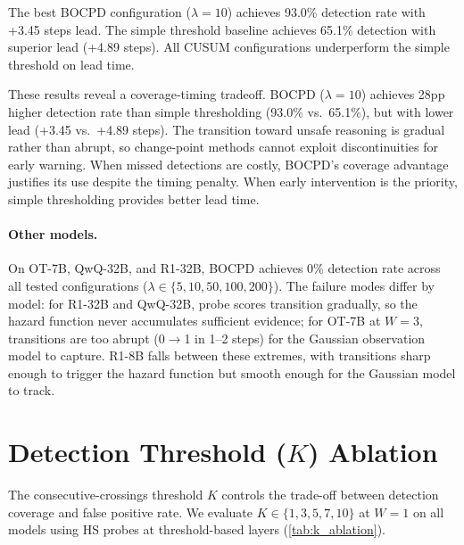 The best BOCPD configuration ($\lambda{=}10$) achieves 93.0\% detection rate with +3.45 steps lead. The simple threshold baseline achieves 65.1\% detection with superior lead (+4.89 steps). All CUSUM configurations underperform the simple threshold on lead time.

These results reveal a coverage-timing tradeoff. BOCPD ($\lambda{=}10$) achieves 28pp higher detection rate than simple thresholding (93.0\% vs.\ 65.1\%), but with lower lead (+3.45 vs.\ +4.89 steps). The transition toward unsafe reasoning is gradual rather than abrupt, so change-point methods cannot exploit discontinuities for early warning. When missed detections are costly, BOCPD's coverage advantage justifies its use despite the timing penalty. When early intervention is the priority, simple thresholding provides better lead time.

\paragraph{Other models.} On OT-7B, QwQ-32B, and R1-32B, BOCPD achieves 0\% detection rate across all tested configurations ($\lambda \in \{5, 10, 50, 100, 200\}$). The failure modes differ by model: for R1-32B and QwQ-32B, probe scores transition gradually, so the hazard function never accumulates sufficient evidence; for OT-7B at $W{=}3$, transitions are too abrupt (0$\to$1 in 1--2 steps) for the Gaussian observation model to capture. R1-8B falls between these extremes, with transitions sharp enough to trigger the hazard function but smooth enough for the Gaussian model to track.


\section{Detection Threshold ($K$) Ablation}
\label{app:k_ablation}

The consecutive-crossings threshold $K$ controls the trade-off between detection coverage and false positive rate. We evaluate $K \in \{1, 3, 5, 7, 10\}$ at $W{=}1$ on all models using HS probes at threshold-based layers (\cref{tab:k_ablation}).

